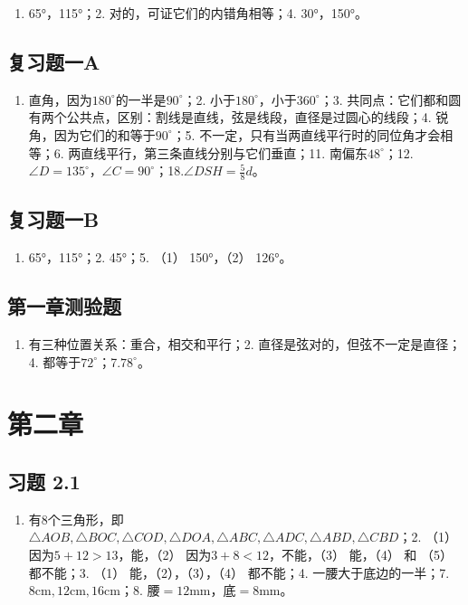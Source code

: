 \begin{enumerate}
\item
  65°，115°；2. 对的，可证它们的内错角相等；4. 30°，150°。
\end{enumerate}

\subsection{复习题一A}

\begin{enumerate}
\item
  直角，因为\(180^{\circ}\)的一半是\(90^{\circ}\)；2.
  小于\(180^{\circ}\)，小于\(360^{\circ}\)；3.
  共同点：它们都和圆有两个公共点，区别：割线是直线，弦是线段，直径是过圆心的线段；4.
  锐角，因为它们的和等于\(90^{\circ}\)；5.
  不一定，只有当两直线平行时的同位角才会相等；6.
  两直线平行，第三条直线分别与它们垂直；11.
  南偏东\(48^{\circ}\)；12.\(\angle D = 135^{\circ}\)，\(\angle C = 90^{\circ}\)；18.\(\angle DSH = \frac{5}{8} d\)。
\end{enumerate}

\subsection{复习题一B}

\begin{enumerate}
\item
  65°，115°；2. 45°；5. （1） 150°，（2） 126°。
\end{enumerate}

\subsection{第一章测验题}

\begin{enumerate}
\item
  有三种位置关系：重合，相交和平行；2.
  直径是弦对的，但弦不一定是直径；4.
  都等于\(72^{\circ}\)；7.\(78^{\circ}\)。
\end{enumerate}

\section{第二章}

\subsection{习题 2.1}

\begin{enumerate}
\item
  有8个三角形，即\(\triangle AOB, \triangle BOC, \triangle COD, \triangle DOA, \triangle ABC, \triangle ADC, \triangle ABD, \triangle CBD\)；2.
  （1） 因为\(5 + 12 > 13\)，能，（2） 因为\(3 + 8 < 12\)，不能，（3）
  能，（4） 和 （5） 都不能；3. （1） 能，（2），（3），（4） 都不能；4.
  一腰大于底边的一半；7.\(8\mathrm{cm}, 12\mathrm{cm}, 16\mathrm{cm}\)；8.
  腰\(= 12\mathrm{mm}\)，底\(= 8\mathrm{mm}\)。
\end{enumerate}

